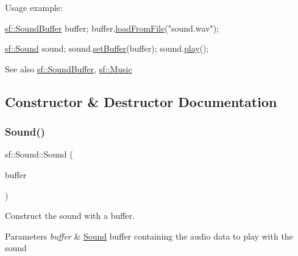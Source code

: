 Usage example\+: 
\begin{DoxyCode}
\hyperlink{classsf_1_1_sound_buffer}{sf::SoundBuffer} buffer;
buffer.\hyperlink{classsf_1_1_sound_buffer_a2be6a8025c97eb622a7dff6cf2594394}{loadFromFile}(\textcolor{stringliteral}{"sound.wav"});

\hyperlink{classsf_1_1_sound}{sf::Sound} sound;
sound.\hyperlink{classsf_1_1_sound_a8b395e9713d0efa48a18628c8ec1972e}{setBuffer}(buffer);
sound.\hyperlink{classsf_1_1_sound_a2953ffe632536e72e696fd880ced2532}{play}();
\end{DoxyCode}


\begin{DoxySeeAlso}{See also}
\hyperlink{classsf_1_1_sound_buffer}{sf\+::\+Sound\+Buffer}, \hyperlink{classsf_1_1_music}{sf\+::\+Music} 
\end{DoxySeeAlso}


\subsection{Constructor \& Destructor Documentation}
\mbox{\label{classsf_1_1_sound_a3b1cfc19a856d4ff8c079ee41bb78e69}} 
\subsubsection{\texorpdfstring{Sound()}{Sound()}\hspace{0.1cm}{\footnotesize\ttfamily [1/2]}}
{\footnotesize\ttfamily sf\+::\+Sound\+::\+Sound (\begin{DoxyParamCaption}\item[{const \hyperlink{classsf_1_1_sound_buffer}{Sound\+Buffer} \&}]{buffer }\end{DoxyParamCaption})\hspace{0.3cm}{\ttfamily [explicit]}}



Construct the sound with a buffer. 


\begin{DoxyParams}{Parameters}
{\em buffer} & \hyperlink{classsf_1_1_sound}{Sound} buffer containing the audio data to play with the sound \\
\hline
\end{DoxyParams}
\mbox{\label{classsf_1_1_sound_ae05eeed6377932694d86b3011be366c0}} 
